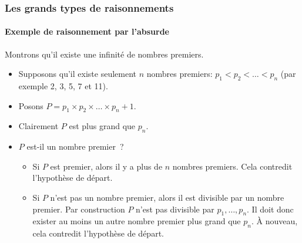 \documentclass[10pt,notheorems]{beamer}
\theoremstyle{plain}
\theoremstyle{definition} %
\begin{document}
\begin{frame}
  \frametitle{Les grands types de raisonnements}
  \framesubtitle{Exemple de raisonnement par l'absurde}
  \hypertarget{slide_raisonnement_par_l_absurde_2}{}

  \bigskip

  Montrons qu'il existe une infinité de nombres premiers.\newline

  \medskip

  \begin{itemize}

  \item Supposons qu'il existe seulement $n$ nombres premiers: $p_1<p_2<\dots<p_n$ (par exemple 2, 3, 5, 7 et 11).\newline

  \item Posons $P = p_1 \times p_2 \times \dots \times p_n + 1$.\newline

  \item Clairement $P$ est plus grand que $p_n$.\newline

  \item $P$ est-il un nombre premier~?\newline

    \begin{itemize}

    \item Si $P$ est premier, alors il y a plus de $n$ nombres premiers. Cela contredit l'hypothèse de départ.\newline

    \item Si $P$ n'est pas un nombre premier, alors il est divisible
      par un nombre premier. Par construction $P$ n'est pas divisible
      par $p_1, \dots, p_n$. Il doit donc exister au moins un autre
      nombre premier plus grand que $p_n$. À nouveau, cela contredit
      l'hypothèse de départ.

    \end{itemize}

  \end{itemize}

\end{frame}

\end{document}
